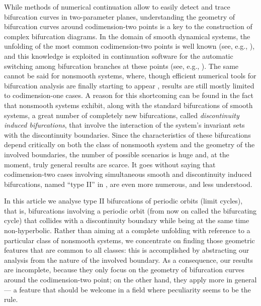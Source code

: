 \documentclass[final,onefignum]{siamltex}
\begin{document}
While methods of numerical continuation allow to easily detect and trace
bifurcation curves in two-parameter planes, understanding the geometry
of bifurcation curves around codimension-two points is a key to the
construction of complex bifurcation diagrams.
In the domain of smooth dynamical systems, the unfolding of the most common
codimension-two points is well known (see, e.g., \citep{Kuznetsov04}), and
this knowledge is exploited in continuation software for the automatic
switching among bifurcation branches at these points
(see, e.g., \citep{Dhooge03,Meijer09}).
The same cannot be said for nonsmooth systems, where,
though efficient numerical tools for bifurcation analysis are finally
starting to appear \citep{Dercole05c,Thota08b},
results are still mostly limited to codimension-one cases.
A reason for this shortcoming can be found in the fact that nonsmooth systems
exhibit, along with the standard bifurcations of smooth systems, a great
number of completely new bifurcations,
called \textit{discontinuity induced bifurcations},
that involve the interaction of the system's invariant sets with the
discontinuity boundaries. Since the characteristics of these bifurcations
depend critically on both the class of nonsmooth system and the geometry of
the involved boundaries, the number of possible scenarios is huge and,
at the moment, truly general results are scarce.
It goes without saying that codimension-two cases involving simultaneous
smooth and discontinuity induced bifurcations, named ``type II'' in \citep{Kowalczyk06}, are even more numerous, and less understood.

In this article we analyse type II bifurcations of periodic orbits (limit cycles), that is, bifurcations involving a periodic orbit (from now on called the bifurcating cycle) that collides with a discontinuity boundary while being at the same time non-hyperbolic.  Rather than aiming at a complete unfolding with reference to a particular class of nonsmooth systems, we concentrate on finding those geometric features that are common to all classes:
this is accomplished by abstracting our analysis from the nature of the involved boundary. As a consequence, our results are incomplete, because they only focus on the geometry of bifurcation curves around the codimension-two point; on the other hand, they apply more in general --- a feature that should be welcome in a field where peculiarity seems to be the rule.  
\end{document}
